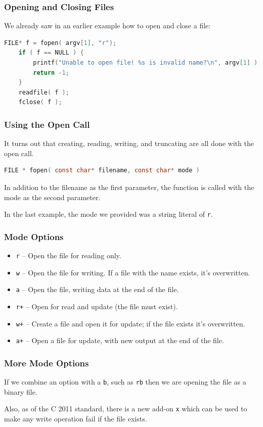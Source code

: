 \begin{frame}[fragile]
\frametitle{Opening and Closing Files}
We already saw in an earlier example how to open and close a file:
\begin{lstlisting}[language=C]
    FILE* f = fopen( argv[1], "r");
    if ( f == NULL ) {
        printf("Unable to open file! %s is invalid name?\n", argv[1] );
        return -1;
    }
    readfile( f );
    fclose( f );
\end{lstlisting}
\end{frame}



\begin{frame}[fragile]
\frametitle{Using the Open Call}

It turns out that creating, reading, writing, and truncating are all done with the open call. 

\begin{lstlisting}[language=C]
FILE * fopen( const char* filename, const char* mode )
\end{lstlisting}

In addition to the filename as the first parameter, the function is called with the mode as the second parameter. 

In the last example, the mode we provided was a string literal of \texttt{r}. 

\end{frame}


\begin{frame}
\frametitle{Mode Options}

\begin{itemize}
	\item \texttt{r} -- Open the file for reading only.
	\item \texttt{w} -- Open the file for writing. If a file with the name exists, it's overwritten.
	\item \texttt{a} -- Open the file, writing data at the end of the file.
	\item \texttt{r+} -- Open for read and update (the file must exist).
	\item \texttt{w+} -- Create a file and open it for update; if the file exists it's overwritten.
	\item \texttt{a+} -- Open a file for update, with new output at the end of the file.
\end{itemize}

\end{frame}


\begin{frame}
\frametitle{More Mode Options}

If we combine an option with a \texttt{b}, such as \texttt{rb} then we are opening the file as a binary file. 

Also, as of the C 2011 standard, there is a new add-on \texttt{x} which can be used to make any write operation fail if the file exists.

\end{frame}

